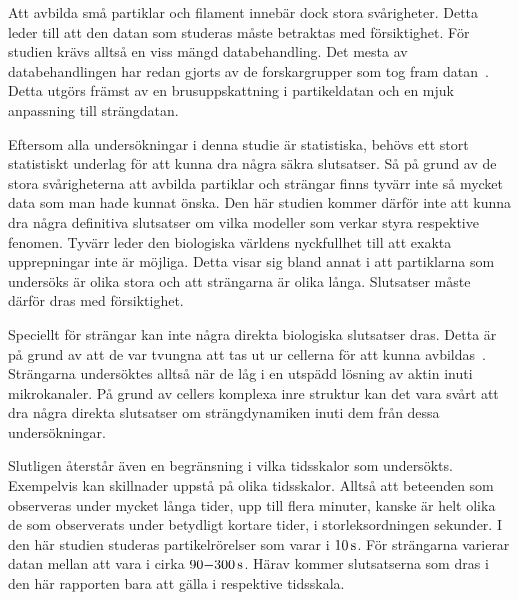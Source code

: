Att avbilda små partiklar och filament innebär dock stora svårigheter. Detta leder till att den datan som studeras måste betraktas med försiktighet. För studien krävs alltså en viss mängd databehandling. Det mesta av databehandlingen har redan gjorts av de forskargrupper som tog fram datan~\cite{Midtveldt_etal2016,Koster_etal2005,Koster_etal2007,Koster_etal2008}. Detta utgörs främst av en brusuppskattning i partikeldatan och en mjuk anpassning till strängdatan.

Eftersom alla undersökningar i denna studie är statistiska, behövs ett stort statistiskt underlag för att kunna dra några säkra slutsatser. Så på grund av de stora svårigheterna att avbilda partiklar och strängar finns tyvärr inte så mycket data som man hade kunnat önska. Den här studien  kommer därför inte att kunna dra några definitiva slutsatser om vilka modeller som verkar styra respektive fenomen.
Tyvärr leder den biologiska världens nyckfullhet till att exakta upprepningar inte är möjliga. Detta visar sig bland annat i att partiklarna som undersöks är olika stora och att strängarna är olika långa. Slutsatser måste därför dras med försiktighet.

Speciellt för strängar kan inte några direkta biologiska slutsatser dras. Detta är på grund av att de var tvungna att tas ut ur cellerna för att kunna avbildas~\cite{Koster_etal2005,Koster_etal2007,Koster_etal2008}. Strängarna undersöktes alltså när de låg i en utspädd lösning av aktin inuti mikrokanaler. På grund av cellers komplexa inre struktur kan det vara svårt att dra några direkta slutsatser om strängdynamiken inuti dem från dessa undersökningar. 

Slutligen återstår även en begränsning i vilka tidsskalor som undersökts.
Exempelvis kan skillnader uppstå på olika tidsskalor. Alltså att beteenden som observeras under mycket långa tider, upp till flera minuter, kanske är helt olika de som observerats under betydligt kortare tider, i storleksordningen sekunder. I den här studien studeras partikelrörelser som varar i $\unit[10]{s}$. För strängarna varierar datan mellan att vara i cirka $\unit[90{-}300]{s}$. Härav kommer slutsatserna som dras i den här rapporten bara att gälla i respektive tidsskala.


